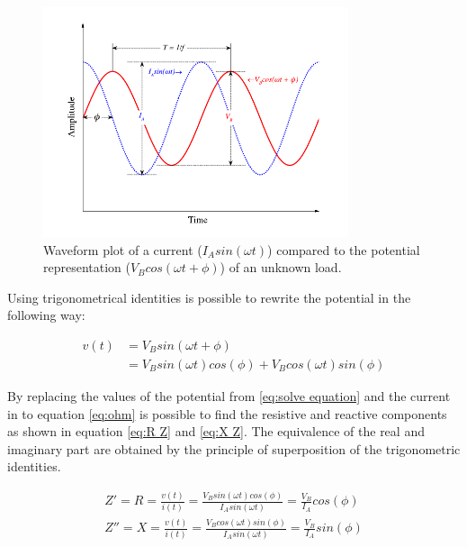 \begin{figure}[!htpb]
	\centering
	\includegraphics[width=0.8\textwidth,keepaspectratio, trim={0cm 0cm 0cm 0cm},clip]{figure_1}    
	\caption[Impedance waveforms]{Waveform plot of a current ($I_A sin (\omega t)$) compared to the potential representation ($V_B cos (\omega t + \phi)$) of an unknown load.}
	\label{fig:impedance wave}
\end{figure}

Using trigonometrical identities is possible to rewrite the potential in the following way:

\begin{equation}
	\label{eq:solve equation}
	\begin{aligned}	
		v(t) & = V_B sin(\omega t + \phi) \\
		     & = V_B sin(\omega t) cos(\phi) + V_B cos(\omega t) sin(\phi)
	\end{aligned}
\end{equation}

By replacing the values of the potential from \ref{eq:solve equation} and the current in to equation \ref{eq:ohm} is possible to find the resistive and reactive components as shown in equation \ref{eq:R Z} and \ref{eq:X Z}. The equivalence of the real and imaginary part are obtained by the principle of superposition of the trigonometric identities. 

\begin{align}
	\label{eq:R Z}
	Z' = R = \frac{v(t)}{i(t)} = \frac{V_B sin(\omega t) cos(\phi)}{I_A sin(\omega t)} = \frac{V_B}{I_A}cos(\phi) \\
	\label{eq:X Z}
	Z'' = X = \frac{v(t)}{i(t)} = \frac{V_B cos(\omega t) sin(\phi)}{I_A sin(\omega t)} = \frac{V_B}{I_A}sin(\phi)
\end{align}


